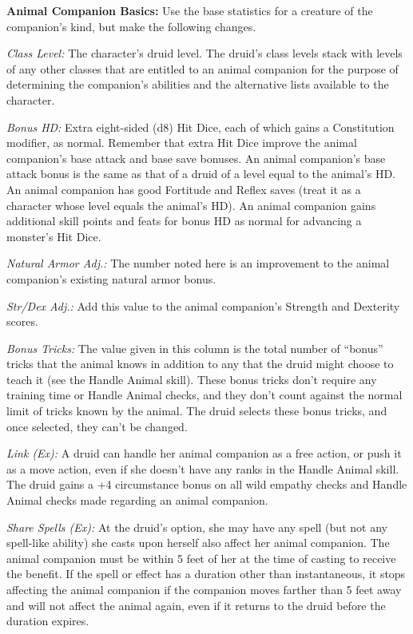 \documentclass{article}
\begin{document}
\textbf{Animal Companion Basics: }Use the base statistics for a creature of the 
companion's kind,\textit{ }but make the following changes.

\textit{Class Level: }The character's druid level. The druid's class levels stack 
with levels of any other classes that are entitled to an animal companion for the 
purpose of determining the companion's abilities and the alternative lists available 
to the character.

\textit{Bonus HD: }Extra eight-sided (d8) Hit Dice, each of which gains a Constitution 
modifier, as normal. Remember that extra Hit Dice improve the animal companion's 
base attack and base save bonuses. An animal companion's base attack bonus is the 
same as that of a druid of a level equal to the animal's HD. An animal companion 
has good Fortitude and Reflex saves (treat it as a character whose level equals 
the animal's HD). An animal companion gains additional skill points and feats for 
bonus HD as normal for advancing a monster's Hit Dice.

\textit{Natural Armor Adj.: }The number noted here is an improvement to the animal 
companion's existing natural armor bonus.

\textit{Str/Dex Adj.: }Add this value to the animal companion's Strength and Dexterity 
scores.

\textit{Bonus Tricks: }The value given in this column is the total number of ``bonus'' 
tricks that the animal knows in addition to any that the druid might choose to 
teach it (see the Handle Animal skill). These bonus tricks don't require any training 
time or Handle Animal checks, and they don't count against the normal limit of 
tricks known by the animal. The druid selects these bonus tricks, and once selected, 
they can't be changed.

\textit{Link (Ex): }A druid can handle her animal companion as a free action, or 
push it as a move action, even if she doesn't have any ranks in the Handle Animal 
skill. The druid gains a +4 circumstance bonus on all wild empathy checks and Handle 
Animal checks made regarding an animal companion.

\textit{Share Spells (Ex): }At the druid's option, she may have any spell (but 
not any spell-like ability) she casts upon herself also affect her animal companion. 
The animal companion must be within 5 feet of her at the time of casting to receive 
the benefit. If the spell or effect has a duration other than instantaneous, it 
stops affecting the animal companion if the companion moves farther than 5 feet 
away and will not affect the animal again, even if it returns to the druid before 
the duration expires. 
\end{document}
